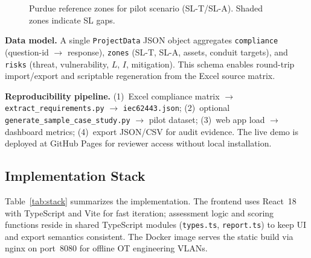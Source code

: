 \documentclass[10pt,conference]{IEEEtran}
\begin{document}
\begin{figure}[!t]
\centering
{}
\caption{Purdue reference zones for pilot scenario (SL-T/SL-A). Shaded zones indicate SL gaps.}
\label{fig:zones}
\end{figure}

\textbf{Data model.} A single \texttt{ProjectData} JSON object aggregates \texttt{compliance} (question-id $\rightarrow$ response), \texttt{zones} (SL-T, SL-A, assets, conduit targets), and \texttt{risks} (threat, vulnerability, $L$, $I$, mitigation). This schema enables round-trip import/export and scriptable regeneration from the Excel source matrix.

\textbf{Reproducibility pipeline.} (1)~Excel compliance matrix $\rightarrow$ \texttt{extract\_requirements.py} $\rightarrow$ \texttt{iec62443.json}; (2)~optional \texttt{generate\_sample\_case\_study.py} $\rightarrow$ pilot dataset; (3)~web app load $\rightarrow$ dashboard metrics; (4)~export JSON/CSV for audit evidence. The live demo is deployed at GitHub Pages for reviewer access without local installation.

\subsection{Implementation Stack}
Table~\ref{tab:stack} summarizes the implementation. The frontend uses React~18 with TypeScript and Vite for fast iteration; assessment logic and scoring functions reside in shared TypeScript modules (\texttt{types.ts}, \texttt{report.ts}) to keep UI and export semantics consistent. The Docker image serves the static build via nginx on port~8080 for offline OT engineering VLANs.
\end{document}
